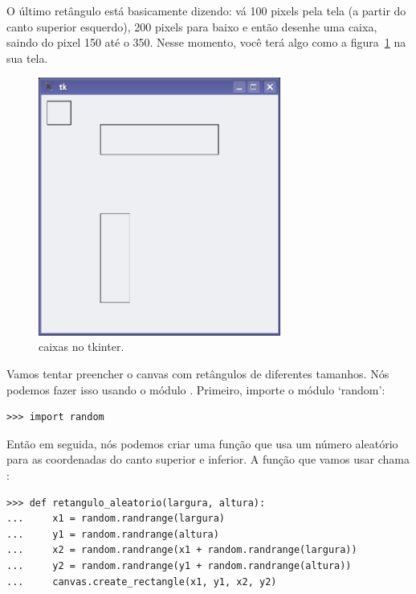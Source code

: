 O último retângulo está basicamente dizendo: vá 100 pixels pela tela (a partir do canto superior esquerdo), 200 pixels para baixo e então desenhe uma caixa, saindo do pixel 150 até o 350. Nesse momento, você terá algo como a figura~\ref{fig33} na sua tela.

\begin{figure}
\begin{center}
\includegraphics[width=80mm]{eps/figure33.eps}
\end{center}
\caption{caixas no tkinter.}\label{fig33}
\end{figure}

Vamos tentar preencher o canvas com retângulos de diferentes tamanhos. Nós podemos fazer isso usando o módulo . Primeiro, importe o módulo `random':

\begin{listing}
\begin{verbatim}
>>> import random
\end{verbatim}
\end{listing}

Então em seguida, nós podemos criar uma função que usa um número aleatório para as coordenadas do canto superior e inferior. A função que vamos usar chama :

\begin{listing}
\begin{verbatim}
>>> def retangulo_aleatorio(largura, altura):
...     x1 = random.randrange(largura)
...     y1 = random.randrange(altura)
...     x2 = random.randrange(x1 + random.randrange(largura))
...     y2 = random.randrange(y1 + random.randrange(altura))
...     canvas.create_rectangle(x1, y1, x2, y2)
\end{verbatim}
\end{listing}

